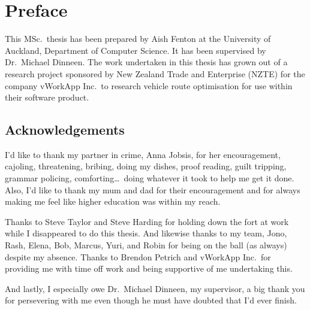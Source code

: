
\chapter*{Preface}

This MSc.~thesis has been prepared by Aish Fenton at the University of Auckland, Department of Computer Science. It has been supervised by Dr.~Michael Dinneen. The work undertaken in this thesis has grown out of a research project sponsored by New Zealand Trade and Enterprise (NZTE) for the company vWorkApp Inc.~to research vehicle route optimisation for use within their software product.

\section*{Acknowledgements}

I'd like to thank my partner in crime, Anna Jobsis, for her encouragement, cajoling, threatening, bribing, doing my dishes, proof reading, guilt tripping, grammar policing, comforting\ldots\ doing whatever it took to help me get it done. Also, I'd like to thank my mum and dad for their encouragement and for always making me feel like higher education was within my reach.

Thanks to Steve Taylor and Steve Harding for holding down the fort at work while I disappeared to do this thesis. And likewise thanks to my team, Jono, Rash, Elena, Bob, Marcus, Yuri, and Robin for being on the ball (as always) despite my absence. Thanks to Brendon Petrich and vWorkApp Inc.~for providing me with time off work and being supportive of me undertaking this. 

And lastly, I especially owe Dr.~Michael Dinneen, my supervisor, a big thank you for persevering with me even though he must have doubted that I'd ever finish.

\cleardoublepage

